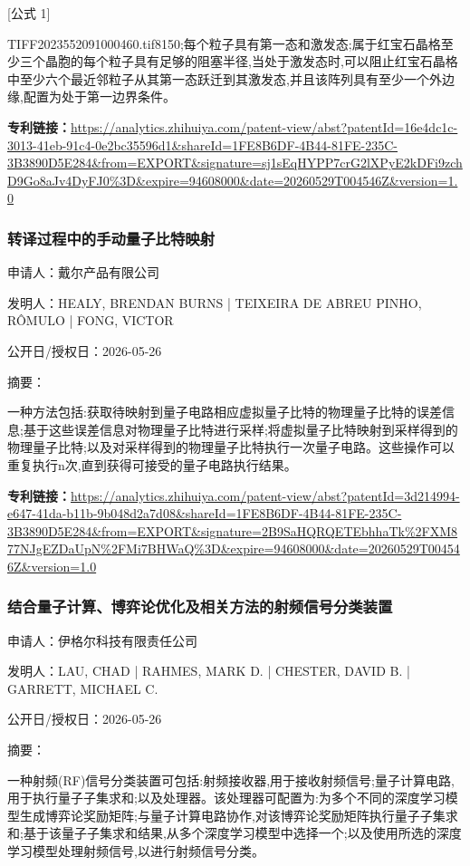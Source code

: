 \documentclass[12pt,a4paper]{ctexart}
\begin{document}
 [公式 1] 

 TIFF2023552091000460.tif8150;每个粒子具有第一态和激发态;属于红宝石晶格至少三个晶胞的每个粒子具有足够的阻塞半径,当处于激发态时,可以阻止红宝石晶格中至少六个最近邻粒子从其第一态跃迁到其激发态,并且该阵列具有至少一个外边缘,配置为处于第一边界条件。

\noindent\textbf{专利链接：}\url{https://analytics.zhihuiya.com/patent-view/abst?patentId=16e4dc1c-3013-41eb-91c4-0e2bc35596d1&shareId=1FE8B6DF-4B44-81FE-235C-3B3890D5E284&from=EXPORT&signature=sj1sEqHYPP7crG2lXPyE2kDFi9zchD9Go8aJv4DyFJ0%3D&expire=94608000&date=20260529T004546Z&version=1.0}

\subsubsection{ 转译过程中的手动量子比特映射 }

申请人：戴尔产品有限公司

发明人：HEALY, BRENDAN BURNS | TEIXEIRA DE ABREU PINHO, RÔMULO | FONG, VICTOR

公开日/授权日：2026-05-26

摘要：

一种方法包括:获取待映射到量子电路相应虚拟量子比特的物理量子比特的误差信息;基于这些误差信息对物理量子比特进行采样;将虚拟量子比特映射到采样得到的物理量子比特;以及对采样得到的物理量子比特执行一次量子电路。这些操作可以重复执行n次,直到获得可接受的量子电路执行结果。

\noindent\textbf{专利链接：}\url{https://analytics.zhihuiya.com/patent-view/abst?patentId=3d214994-e647-41da-b11b-9b048d2a7d08&shareId=1FE8B6DF-4B44-81FE-235C-3B3890D5E284&from=EXPORT&signature=2B9SaHQRQETEbhhaTk%2FXM877NJgEZDaUpN%2FMi7BHWaQ%3D&expire=94608000&date=20260529T004546Z&version=1.0}

\subsubsection{ 结合量子计算、博弈论优化及相关方法的射频信号分类装置 }

申请人：伊格尔科技有限责任公司

发明人：LAU, CHAD | RAHMES, MARK D. | CHESTER, DAVID B. | GARRETT, MICHAEL C.

公开日/授权日：2026-05-26

摘要：

一种射频(RF)信号分类装置可包括:射频接收器,用于接收射频信号;量子计算电路,用于执行量子子集求和;以及处理器。该处理器可配置为:为多个不同的深度学习模型生成博弈论奖励矩阵;与量子计算电路协作,对该博弈论奖励矩阵执行量子子集求和;基于该量子子集求和结果,从多个深度学习模型中选择一个;以及使用所选的深度学习模型处理射频信号,以进行射频信号分类。
\end{document}
